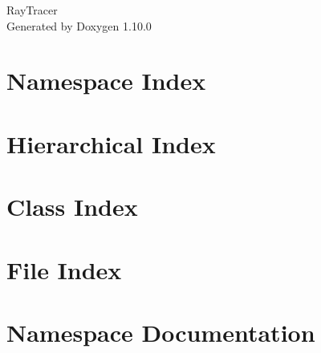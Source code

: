 \documentclass[twoside]{book}
\newcommand{\+}{\discretionary{\mbox{\scriptsize$\hookleftarrow$}}{}{}}
\newcommand{\clearemptydoublepage}{%
    \newpage{\pagestyle{empty}\cleardoublepage}%
  }
\begin{document}
  \raggedbottom
    \hypersetup{pageanchor=false,
                bookmarksnumbered=true,
                pdfencoding=unicode
               }
  \begin{titlepage}
  \vspace*{7cm}
  \begin{center}%
  {\Large Ray\+Tracer}\\
  \vspace*{1cm}
  {\large Generated by Doxygen 1.10.0}\\
  \end{center}
  \end{titlepage}
  \clearemptydoublepage
  \tableofcontents
  \clearemptydoublepage
  \hypersetup{pageanchor=true}
\chapter{Namespace Index}

\chapter{Hierarchical Index}

\chapter{Class Index}

\chapter{File Index}

\chapter{Namespace Documentation}

\end{document}
